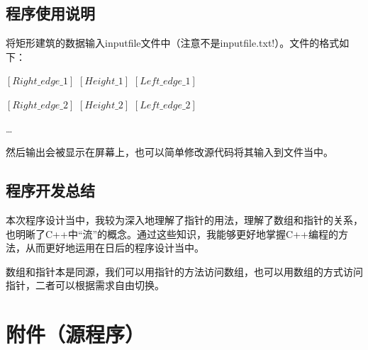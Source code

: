 \documentclass[a4paper]{ctexart}
\begin{document}
	\subsection{程序使用说明}
	将矩形建筑的数据输入inputfile文件中（注意不是inputfile.txt!）。文件的格式如下：

	$[Right\_edge\_1]$ $[Height\_1]$ $[Left\_edge\_1]$

	$[Right\_edge\_2]$ $[Height\_2]$ $[Left\_edge\_2]$

	\dots

	然后输出会被显示在屏幕上，也可以简单修改源代码将其输入到文件当中。

	\subsection{程序开发总结}
	本次程序设计当中，我较为深入地理解了指针的用法，理解了数组和指针的关系，也明晰了C++中“流”的概念。通过这些知识，我能够更好地掌握C++编程的方法，从而更好地运用在日后的程序设计当中。

	数组和指针本是同源，我们可以用指针的方法访问数组，也可以用数组的方式访问指针，二者可以根据需求自由切换。
	\section{附件（源程序）}
	
	
	
\end{document}
